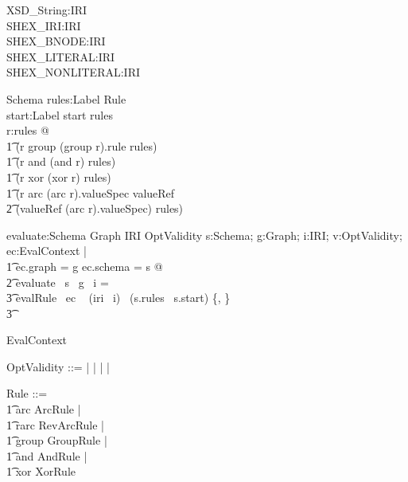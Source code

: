 \begin{axdef}
XSD\_String:IRI \\
SHEX\_IRI:IRI \\
SHEX\_BNODE:IRI \\
SHEX\_LITERAL:IRI \\
SHEX\_NONLITERAL:IRI
\end{axdef}
        

\begin{schema}{Schema}
   rules:Label \pfun Rule \\
   start:Label
\where
   start \in \dom rules \\
\forall r:\ran rules @ \\
\t1 (r \in \ran group \implies (group \entryFor r).rule \in \dom rules) \land \\
\t1 (r \in \ran and \implies \ran (and \entryFor r) \subseteq \dom rules) \land \\
\t1 (r \in \ran xor \implies \ran (xor \entryFor r) \subseteq \dom rules) \land \\ 
\t1 (r \in \ran arc \land (arc \entryFor r).valueSpec \in \ran valueRef \implies \\
\t2 (valueRef \entryFor (arc \entryFor r).valueSpec) \in \dom rules)
\end{schema}
		

\begin{zed}
[Label]
\end{zed}
		

\begin{gendef}
   evaluate:Schema \fun Graph \fun IRI \fun OptValidity
\where
\forall s:Schema; g:Graph; i:IRI; v:OptValidity; ec:EvalContext | \\
\t1 ec.graph = g \land ec.schema = s @ \\
\t2		evaluate ~s ~g ~i = \\
\t3			\IF evalRule ~ec ~ (iri~ i)~ (s.rules~ s.start) \in \{\nomatch, \pass\} \\
\t3			\THEN \pass \ELSE \fail
\end{gendef}
        

\begin{zed}
EvalContext 
\end{zed}
		

\begin{zed}
OptValidity ::= \pass | \fail | \nomatch | \none | \error \\
\end{zed}
        

\begin{zed}
Rule ::= \\
\t1	arc \ldata ArcRule \rdata | \\
\t1 rarc \ldata RevArcRule \rdata | \\
\t1 group \ldata GroupRule \rdata | \\
\t1 and \ldata AndRule \rdata | \\
\t1 xor \ldata XorRule \rdata \\
\end{zed}
        

